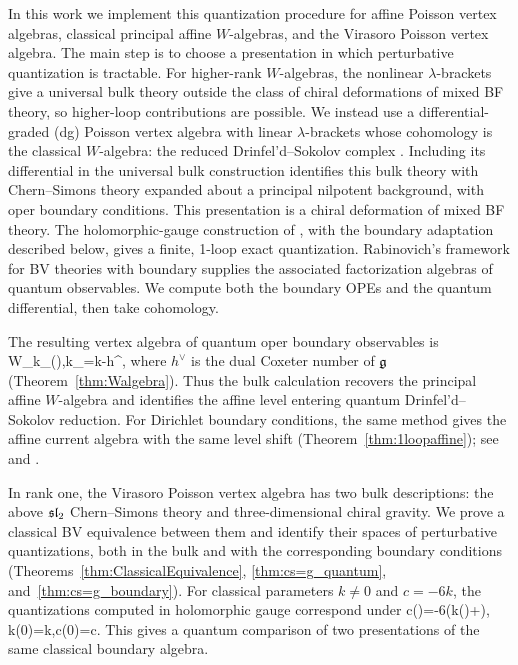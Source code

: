 \documentclass[11pt]{amsart}
\numberwithin{equation}{section}
\numberwithin{figure}{section}
\numberwithin{table}{section}
\begin{document}
In this work we implement this quantization procedure for affine Poisson vertex algebras, classical principal affine $W$-algebras, and the Virasoro Poisson vertex algebra.
The main step is to choose a presentation in which perturbative quantization is tractable.
For higher-rank $W$-algebras, the nonlinear $\lambda$-brackets give a universal bulk theory outside the class of chiral deformations of mixed BF theory, so higher-loop contributions are possible.
We instead use a differential-graded (dg) Poisson vertex algebra with linear $\lambda$-brackets whose cohomology is the classical $W$-algebra: the reduced Drinfel'd--Sokolov complex \cite{dBT94, FBZ}.
Including its differential in the universal bulk construction identifies this bulk theory with Chern--Simons theory expanded about a principal nilpotent background, with oper boundary conditions.
This presentation is a chiral deformation of mixed BF theory.
The holomorphic-gauge construction of \cite{Gwilliam:2019cbp}, with the boundary adaptation described below, gives a finite, 1-loop exact quantization.
Rabinovich's framework for BV theories with boundary \cite{EugeneThesis} supplies the associated factorization algebras of quantum observables.
We compute both the boundary OPEs and the quantum differential, then take cohomology.

The resulting vertex algebra of quantum oper boundary observables is
\be
 W_{k_\hbar}(\fg),\qquad k_\hbar=k-h^\vee\hbar,
\ee
where $h^\vee$ is the dual Coxeter number of $\mathfrak{g}$ (Theorem~\ref{thm:Walgebra}).
Thus the bulk calculation recovers the principal affine $W$-algebra and identifies the affine level entering quantum Drinfel'd--Sokolov reduction.
For Dirichlet boundary conditions, the same method gives the affine current algebra with the same level shift
(Theorem~\ref{thm:1loopaffine}); see \cite{Gwilliam:2019cbp} and \cite[Sec.~7.1]{Costello:2020ndc}.

In rank one, the Virasoro Poisson vertex algebra has two bulk descriptions: the above $\mathfrak{sl}_2$ Chern--Simons theory and three-dimensional chiral gravity.
We prove a classical BV equivalence between them and identify their spaces of perturbative quantizations, both in the bulk and with the corresponding boundary conditions (Theorems~\ref{thm:ClassicalEquivalence}, \ref{thm:cs=g_quantum}, and~\ref{thm:cs=g_boundary}).
For classical parameters $k\neq0$ and $c=-6k$, the quantizations computed in holomorphic gauge correspond under
\be
 c(\hbar)=-6\left(k(\hbar)+\right),
 \qquad k(0)=k,\quad c(0)=c.
\ee
This gives a quantum comparison of two presentations of the same classical boundary algebra.
\end{document}
